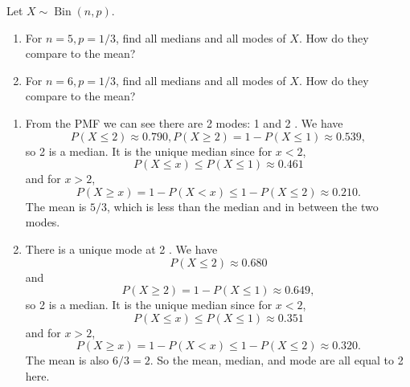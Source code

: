 
\setcounter{theorem}{3}
\begin{exercise} [BH.6.4] Let $X \sim \operatorname{Bin}(n, p)$.
	\begin{enumerate}
		\item For $n=5, p=1 / 3$, find all medians and all modes of $X$. How do they compare to the mean?
	\item For $n=6, p=1 / 3$, find all medians and all modes of $X$. How do they compare to the mean?
	\end{enumerate}

\begin{solution}
    \begin{enumerate}
        \item   From the PMF we can see there are 2 modes:   1 and 2 . We have
        $$
        P(X \leq 2) \approx 0.790, P(X \geq 2)=1-P(X \leq 1) \approx 0.539,
        $$
        so 2 is a median. It is the unique median since for $x<2$,
        $$
        P(X \leq x) \leq P(X \leq 1) \approx 0.461
        $$
        and for $x>2$,
        $$
        P(X \geq x)=1-P(X<x) \leq 1-P(X \leq 2) \approx 0.210 .
        $$
        The mean is $5 / 3$, which is less than the median and in between the two modes.
        \item There is a unique mode at 2 . We have
        $$
        P(X \leq 2) \approx 0.680
        $$
        and
        $$
        P(X \geq 2)=1-P(X \leq 1) \approx 0.649,
        $$
        so 2 is a median. It is the unique median since for $x<2$,
        $$
        P(X \leq x) \leq P(X \leq 1) \approx 0.351
        $$
        and for $x>2$,
        $$
        P(X \geq x)=1-P(X<x) \leq 1-P(X \leq 2) \approx 0.320 .
        $$
        The mean is also $6 / 3=2$. So the mean, median, and mode are all equal to 2 here.
    \end{enumerate}
\end{solution}
\end{exercise}


